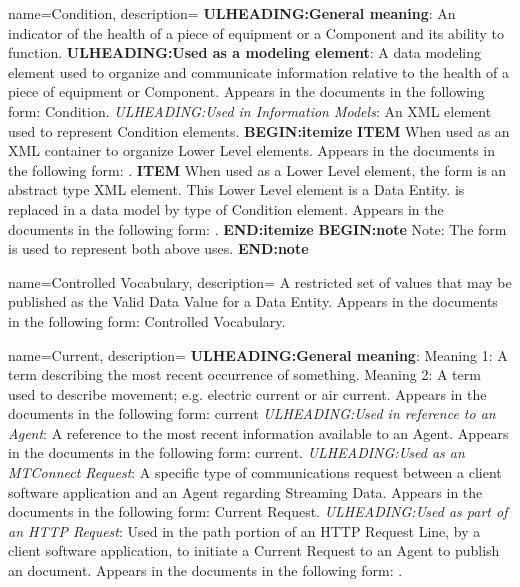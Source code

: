 {
    name={Condition},
	description={
	\textbf{ULHEADING:General meaning}:
	An indicator of the health of a piece of equipment or a \gls{Component} and its ability to function.
	\textbf{ULHEADING:Used as a modeling element}:
	A data modeling element used to organize and communicate information relative to the health of a piece of equipment or \gls{Component}.
	Appears in the documents in the following form: \gls{Condition}.
	\textit{ULHEADING:Used in \gls{Information Models}}:
	An XML element used to represent \gls{Condition} elements.
    \textbf{BEGIN:itemize}
	\textbf{ITEM} When used as an XML container to organize \gls{Lower Level}  elements.
	Appears in the documents in the following form: .
	\textbf{ITEM} When used as a \gls{Lower Level} element, the form  is an abstract type XML element.  This \gls{Lower Level} element is a \gls{Data Entity}.   is replaced in a data model by type of \gls{Condition} element.
	Appears in the documents in the following form: .
	\textbf{END:itemize}
	\textbf{BEGIN:note}
	Note: The form  is used to represent both above uses.
	\textbf{END:note}
}
}

{
    name={Controlled Vocabulary},
	description={
	A restricted set of values that may be published as the \gls{Valid Data Value} for a \gls{Data Entity}.
	Appears in the documents in the following form: \gls{Controlled Vocabulary}.
}
}

{
    name={Current},
	description={
	\textbf{ULHEADING:General meaning}:
	Meaning 1:  A term describing the most recent occurrence of something.
	Meaning 2:  A term used to describe movement; e.g. electric current or air current.
	Appears in the documents in the following form: current
	\textit{ULHEADING:Used in reference to an \gls{Agent}}:
	A reference to the most recent information available to an \gls{Agent}.
	Appears in the documents in the following form: current.
	\textit{ULHEADING:Used as an \gls{MTConnect Request}}:
	A specific type of communications request between a client software application and an \gls{Agent} regarding \gls{Streaming Data}.  
	Appears in the documents in the following form: \gls{Current Request}.
	\textit{ULHEADING:Used as part of an \gls{HTTP Request}}:
	Used in the path portion of an \gls{HTTP Request Line}, by a client software application, to initiate a \gls{Current Request} to an \gls{Agent} to publish an  document.
	Appears in the documents in the following form: .
}
}

